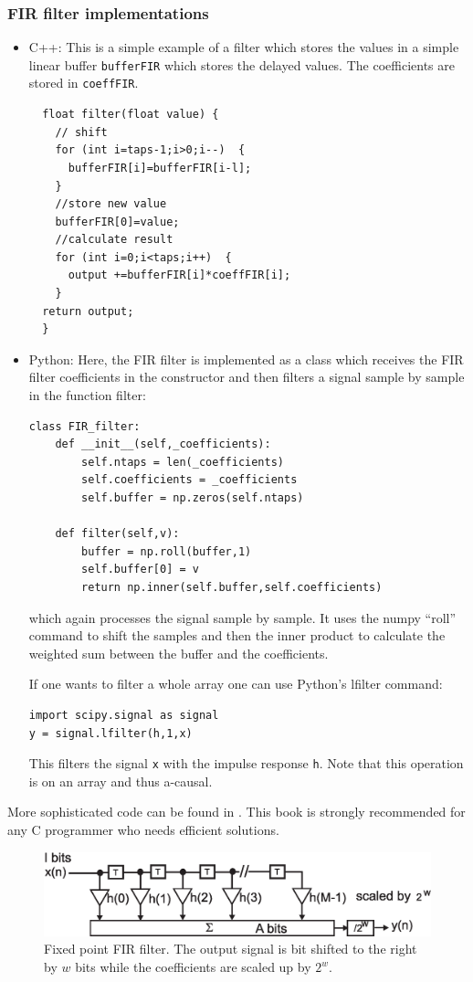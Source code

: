 \documentclass[12pt,a4paper]{article}
\begin{document}
\subsubsection{FIR filter implementations}
\begin{itemize}
\item C++:
This is a simple example of a filter which stores the values
in a simple linear buffer \texttt{bufferFIR} which stores the
delayed values. The coefficients are stored in \texttt{coeffFIR}.
\begin{verbatim}
  float filter(float value) {
    // shift
    for (int i=taps-1;i>0;i--)  {
      bufferFIR[i]=bufferFIR[i-l];
    }
    //store new value
    bufferFIR[0]=value;
    //calculate result
    for (int i=0;i<taps;i++)  {
      output +=bufferFIR[i]*coeffFIR[i];
    }
  return output;
  }
\end{verbatim}

\item Python: Here, the FIR filter is implemented as a
  class which receives the FIR filter coefficients
  in the constructor and then filters a signal sample
  by sample in the function filter:
  
\begin{verbatim}
class FIR_filter:
    def __init__(self,_coefficients):
        self.ntaps = len(_coefficients)
        self.coefficients = _coefficients
        self.buffer = np.zeros(self.ntaps)

    def filter(self,v):
        buffer = np.roll(buffer,1)
        self.buffer[0] = v
        return np.inner(self.buffer,self.coefficients)
\end{verbatim}
which again processes the signal sample by sample. It uses
the numpy ``roll'' command to shift the samples and then
the inner product to calculate the weighted sum between
the buffer and the coefficients.

If one wants
to filter a whole array one can use Python's lfilter command:
\begin{verbatim}
import scipy.signal as signal
y = signal.lfilter(h,1,x)
\end{verbatim}
This filters the signal \texttt{x} with the impulse response
\texttt{h}. Note that this operation is on an array and thus
a-causal.
\end{itemize}
More sophisticated code can be found in \citet{NumericalRec2007}.
This book is strongly recommended for any C programmer who
needs efficient solutions.


\begin{figure}[!hbt]
\begin{center}
\mbox{\includegraphics[width=\linewidth]{fir_fixed}}
\caption{Fixed point FIR filter. The output signal is bit shifted to the
  right by $w$ bits while the coefficients are scaled up by $2^w$. \label{fir_fixed}}
\end{center}
\end{figure}
\end{document}
